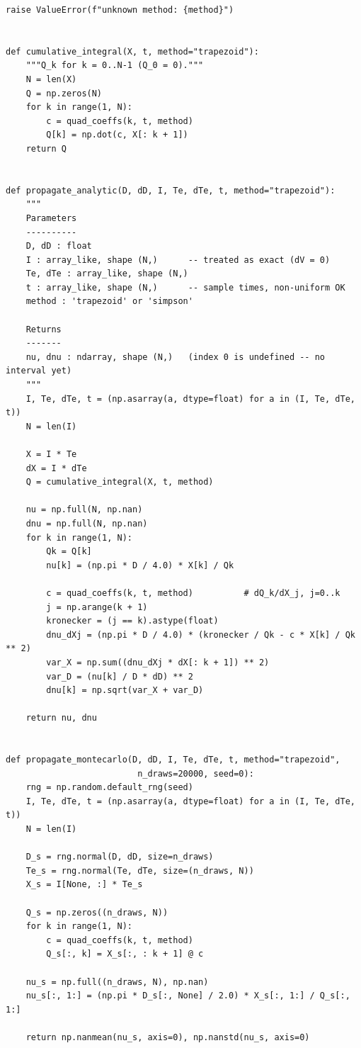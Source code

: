 \documentclass[11pt,twoside]{article}
\begin{document}
\begin{lstlisting}[caption={Example implementation of the recession rate calculation in Python}]
    raise ValueError(f"unknown method: {method}")


def cumulative_integral(X, t, method="trapezoid"):
    """Q_k for k = 0..N-1 (Q_0 = 0)."""
    N = len(X)
    Q = np.zeros(N)
    for k in range(1, N):
        c = quad_coeffs(k, t, method)
        Q[k] = np.dot(c, X[: k + 1])
    return Q


def propagate_analytic(D, dD, I, Te, dTe, t, method="trapezoid"):
    """
    Parameters
    ----------
    D, dD : float
    I : array_like, shape (N,)      -- treated as exact (dV = 0)
    Te, dTe : array_like, shape (N,)
    t : array_like, shape (N,)      -- sample times, non-uniform OK
    method : 'trapezoid' or 'simpson'

    Returns
    -------
    nu, dnu : ndarray, shape (N,)   (index 0 is undefined -- no interval yet)
    """
    I, Te, dTe, t = (np.asarray(a, dtype=float) for a in (I, Te, dTe, t))
    N = len(I)

    X = I * Te
    dX = I * dTe
    Q = cumulative_integral(X, t, method)

    nu = np.full(N, np.nan)
    dnu = np.full(N, np.nan)
    for k in range(1, N):
        Qk = Q[k]
        nu[k] = (np.pi * D / 4.0) * X[k] / Qk

        c = quad_coeffs(k, t, method)          # dQ_k/dX_j, j=0..k
        j = np.arange(k + 1)
        kronecker = (j == k).astype(float)
        dnu_dXj = (np.pi * D / 4.0) * (kronecker / Qk - c * X[k] / Qk ** 2)
        var_X = np.sum((dnu_dXj * dX[: k + 1]) ** 2)
        var_D = (nu[k] / D * dD) ** 2
        dnu[k] = np.sqrt(var_X + var_D)

    return nu, dnu


def propagate_montecarlo(D, dD, I, Te, dTe, t, method="trapezoid",
                          n_draws=20000, seed=0):
    rng = np.random.default_rng(seed)
    I, Te, dTe, t = (np.asarray(a, dtype=float) for a in (I, Te, dTe, t))
    N = len(I)

    D_s = rng.normal(D, dD, size=n_draws)
    Te_s = rng.normal(Te, dTe, size=(n_draws, N))
    X_s = I[None, :] * Te_s

    Q_s = np.zeros((n_draws, N))
    for k in range(1, N):
        c = quad_coeffs(k, t, method)
        Q_s[:, k] = X_s[:, : k + 1] @ c

    nu_s = np.full((n_draws, N), np.nan)
    nu_s[:, 1:] = (np.pi * D_s[:, None] / 2.0) * X_s[:, 1:] / Q_s[:, 1:]

    return np.nanmean(nu_s, axis=0), np.nanstd(nu_s, axis=0)



\end{lstlisting}
\end{document}
